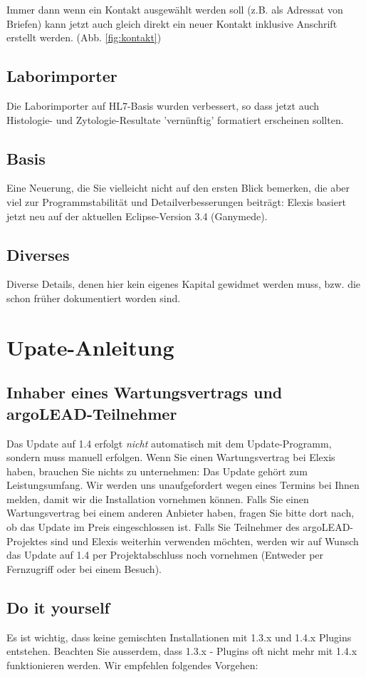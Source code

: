 \documentclass[a4paper]{scrartcl}
\begin{document}
Immer dann wenn ein Kontakt ausgewählt werden soll (z.B. als Adressat von Briefen) kann jetzt auch gleich direkt ein neuer Kontakt inklusive Anschrift erstellt werden. (Abb. \ref{fig:kontakt})

\subsection{Laborimporter}
Die Laborimporter auf HL7-Basis wurden verbessert, so dass jetzt auch Histologie- und Zytologie-Resultate 'vernünftig' formatiert erscheinen sollten.

\subsection{Basis}
Eine Neuerung, die Sie vielleicht nicht auf den ersten Blick bemerken, die aber viel zur Programmstabilität und Detailverbesserungen beiträgt: Elexis basiert jetzt neu auf der aktuellen Eclipse-Version 3.4 (Ganymede).

\subsection{Diverses}
Diverse Details, denen hier kein eigenes Kapital gewidmet werden muss, bzw. die schon früher dokumentiert worden sind.

\section{Upate-Anleitung}
\label{update}
\subsection{Inhaber eines Wartungsvertrags und argoLEAD-Teilnehmer}
Das Update auf 1.4 erfolgt \textit{nicht} automatisch mit dem Update-Programm, sondern muss manuell erfolgen. Wenn Sie einen Wartungsvertrag bei Elexis haben, brauchen Sie nichts zu unternehmen: Das Update gehört zum Leistungsumfang. Wir werden uns unaufgefordert wegen eines Termins bei Ihnen melden, damit wir die Installation vornehmen können. Falls Sie einen Wartungsvertrag bei einem anderen Anbieter haben, fragen Sie bitte dort nach, ob das Update im Preis eingeschlossen ist. Falls Sie Teilnehmer des argoLEAD-Projektes sind und Elexis weiterhin verwenden möchten, werden wir auf Wunsch das Update auf 1.4 per Projektabschluss noch vornehmen (Entweder per Fernzugriff oder bei einem Besuch).

\subsection{Do it yourself}
Es ist wichtig, dass keine gemischten Installationen mit 1.3.x und 1.4.x Plugins entstehen. Beachten Sie ausserdem, dass 1.3.x - Plugins oft nicht mehr mit 1.4.x funktionieren werden. Wir empfehlen folgendes Vorgehen:
\end{document}
